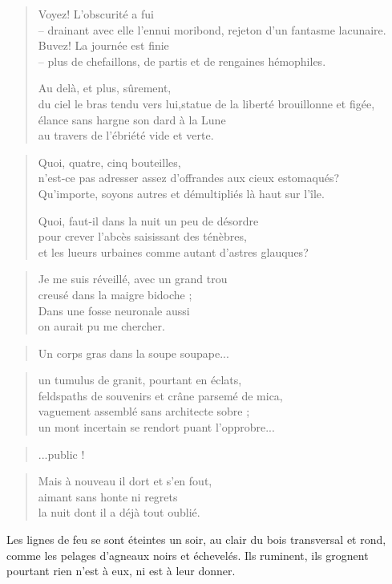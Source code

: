   \begin{verse}
    Voyez! L'obscurité a fui\\
    -- drainant avec elle l'ennui moribond, rejeton d'un fantasme lacunaire.\\
    Buvez! La journée est finie\\
    -- plus de chefaillons, de partis et de rengaines hémophiles.

    Au delà, et plus, sûrement,\\
    du ciel le bras tendu vers lui,statue de la liberté brouillonne et figée,\\
    élance sans hargne son dard à la Lune\\
    au travers de l'ébriété vide et verte.
  \end{verse}
  \begin{verse}
    Quoi, quatre, cinq bouteilles,\\
    n'est-ce pas adresser assez d'offrandes aux cieux estomaqués?\\
    Qu'importe, soyons autres et démultipliés là haut sur l'île.

    Quoi, faut-il dans la nuit un peu de désordre\\
    pour crever l'abcès saisissant des ténèbres,\\
    et les lueurs urbaines comme autant d'astres glauques?
  \end{verse}
  \begin{verse}
    Je me suis réveillé, avec un grand trou\\
    creusé dans la maigre bidoche ;\\
    Dans une fosse neuronale aussi\\
    on aurait pu me chercher.
  \end{verse}
  \begin{verse}
    Un corps gras dans la soupe soupape...
  \end{verse}
  \begin{verse}
    un tumulus de granit, pourtant en éclats,\\
    feldspaths de souvenirs et crâne parsemé de mica,\\
    vaguement assemblé sans architecte sobre ;\\
    un mont incertain se rendort puant l'opprobre...
  \end{verse}
  \begin{verse}
    ...public !
  \end{verse}
  \begin{verse}
    Mais à nouveau il dort et s'en fout,\\
    aimant sans honte ni regrets\\
    la nuit dont il a déjà tout oublié.
  \end{verse}
  Les lignes de feu se sont éteintes  un soir, au clair du bois transversal et
  rond, comme  les pelages  d'agneaux noirs et  échevelés. Ils  ruminent, ils
  grognent pourtant rien n'est à eux, ni est à leur donner.

